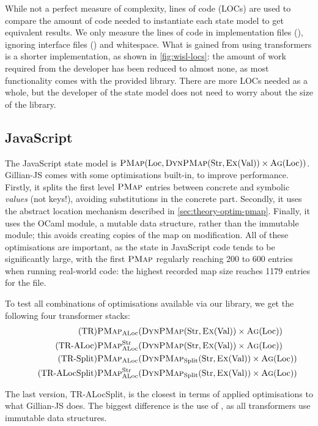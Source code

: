 While not a perfect measure of complexity, lines of code (LOCs) are used to compare the amount of code needed to instantiate each state model to get equivalent results. We only measure the lines of code in implementation files (), ignoring interface files () and whitespace. What is gained from using transformers is a shorter implementation, as shown in \autoref{fig:wisl-locs}: the amount of work required from the developer has been reduced to almost none, as most functionality comes with the provided library. There are more LOCs needed as a whole, but the developer of the state model does not need to worry about the size of the library.

\subsection{JavaScript}

The JavaScript state model is $\textsc{PMap}(\text{Loc}, \textsc{DynPMap}(\text{Str}, \textsc{Ex}(\text{Val})) \times \textsc{Ag}(\text{Loc}))$. Gillian-JS comes with some optimisations built-in, to improve performance. Firstly, it splits the first level $\textsc{PMap}$ entries between concrete and symbolic \emph{values} (not keys!), avoiding substitutions in the concrete part. Secondly, it uses the abstract location mechanism described in \cref{sec:theory-optim-pmap}. Finally, it uses the OCaml  module, a mutable data structure, rather than the immutable  module; this avoids creating copies of the map on modification. All of these optimisations are important, as the state in JavaScript code tends to be significantly large, with the first $\textsc{PMap}$ regularly reaching 200 to 600 entries when running real-world code: the highest recorded map size reaches 1179 entries for the  file.

To test all combinations of optimisations available via our library, we get the following four transformer stacks:
\begin{align}
\tag{TR}           & \textsc{PMap}_{\text{ALoc}}(\textsc{DynPMap}(\text{Str}, \textsc{Ex}(\text{Val})) \times \textsc{Ag}(\text{Loc})) \\
\tag{TR-ALoc}      & \textsc{PMap}_{\text{ALoc}}^{\text{Str}}(\textsc{DynPMap}(\text{Str}, \textsc{Ex}(\text{Val})) \times \textsc{Ag}(\text{Loc})) \\
\tag{TR-Split}     & \textsc{PMap}_{\text{ALoc}}(\textsc{DynPMap}_{\text{Split}}(\text{Str}, \textsc{Ex}(\text{Val})) \times \textsc{Ag}(\text{Loc})) \\
\tag{TR-ALocSplit} & \textsc{PMap}_{\text{ALoc}}^{\text{Str}}(\textsc{DynPMap}_{\text{Split}}(\text{Str}, \textsc{Ex}(\text{Val})) \times \textsc{Ag}(\text{Loc}))
 \end{align}

The last version, TR-ALocSplit, is the closest in terms of applied optimisations to what Gillian-JS does. The biggest difference is the use of , as all transformers use immutable data structures.

